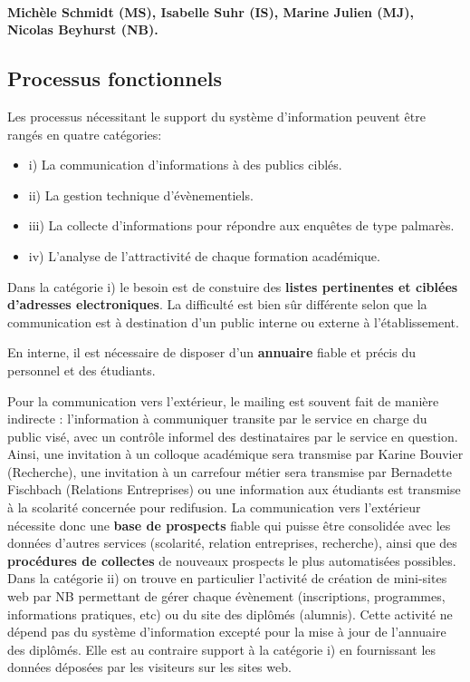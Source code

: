 \documentclass{book}
\begin{document}
\paragraph{Michèle Schmidt (MS), Isabelle Suhr (IS), Marine Julien (MJ), 
Nicolas Beyhurst (NB).}

\subsection{Processus fonctionnels}
Les processus nécessitant le support du système d'information peuvent 
être rangés en quatre catégories:
\begin{itemize}
\item i) La communication d'informations à des publics ciblés.
\item ii) La gestion technique d'évènementiels.
\item iii) La collecte d'informations pour répondre aux enquêtes de type 
      palmarès.
\item iv) L'analyse de l'attractivité de chaque formation académique.
\end{itemize}
\bigskip

Dans la catégorie i) le besoin est de constuire des \textbf{listes 
pertinentes et ciblées d'adresses electroniques}. La difficulté
est bien sûr différente selon que la communication est à destination
d'un public interne ou externe à l'établissement.

En interne, il est nécessaire de disposer d'un \textbf{annuaire}
fiable et précis du personnel et des étudiants.

Pour la communication vers l'extérieur, le mailing est souvent 
fait de manière indirecte : l'information à communiquer transite par
le service en charge du public visé, avec un contrôle informel des 
destinataires par le service en question. Ainsi, une invitation à un 
colloque académique sera transmise par Karine Bouvier (Recherche),
une invitation à un carrefour métier sera transmise par Bernadette 
Fischbach (Relations Entreprises) ou une information aux étudiants
est transmise à la scolarité concernée pour redifusion. La communication 
vers l'extérieur nécessite donc une \textbf{base de prospects} fiable 
qui puisse être consolidée avec les données d'autres services (scolarité, 
relation entreprises, recherche), ainsi que des \textbf{procédures 
de collectes} de nouveaux prospects le plus automatisées possibles.\\

Dans la catégorie ii) on trouve en particulier l'activité de création
de mini-sites web par NB permettant de gérer chaque évènement (inscriptions,
programmes, informations pratiques, etc) ou du site des diplômés (alumnis).
Cette activité ne dépend pas du système d'information excepté pour
la mise à jour de l'annuaire des diplômés. Elle est au contraire 
support à la catégorie i) en fournissant les données déposées par les
visiteurs sur les sites web.\\ 
\end{document}
